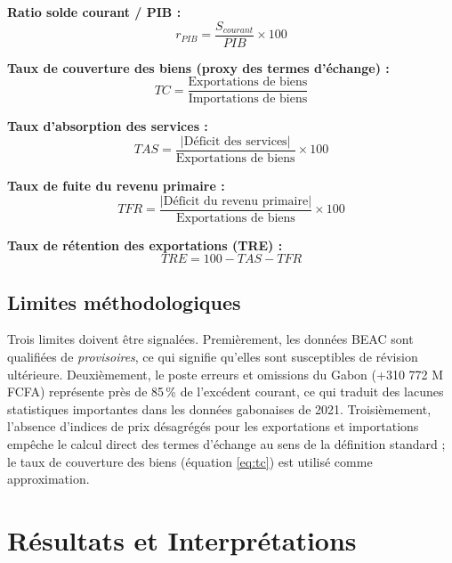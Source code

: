 \documentclass[12pt,a4paper]{article}
\begin{document}
\textbf{Ratio solde courant / PIB :}
\begin{equation}
  r_{PIB} = \frac{S_{courant}}{PIB} \times 100
  \label{eq:ratio_pib}
\end{equation}

\textbf{Taux de couverture des biens (proxy des termes d'échange) :}
\begin{equation}
  TC = \frac{\text{Exportations de biens}}{\text{Importations de biens}}
  \label{eq:tc}
\end{equation}

\textbf{Taux d'absorption des services :}
\begin{equation}
  TAS = \frac{|\text{Déficit des services}|}{\text{Exportations de biens}} \times 100
  \label{eq:tas}
\end{equation}

\textbf{Taux de fuite du revenu primaire :}
\begin{equation}
  TFR = \frac{|\text{Déficit du revenu primaire}|}{\text{Exportations de biens}} \times 100
  \label{eq:tfr}
\end{equation}

\textbf{Taux de rétention des exportations (TRE) :}
\begin{equation}
  TRE = 100 - TAS - TFR
  \label{eq:tre}
\end{equation}

\subsection{Limites méthodologiques}

Trois limites doivent être signalées. Premièrement, les données BEAC sont qualifiées de
\textit{provisoires}, ce qui signifie qu'elles sont susceptibles de révision ultérieure.
Deuxièmement, le poste erreurs et omissions du Gabon (+310 772 M FCFA) représente près de
85\,\% de l'excédent courant, ce qui traduit des lacunes statistiques importantes dans les
données gabonaises de 2021. Troisièmement, l'absence d'indices de prix désagrégés pour les
exportations et importations empêche le calcul direct des termes d'échange au sens de la
définition standard ; le taux de couverture des biens (équation \ref{eq:tc}) est utilisé
comme approximation.

\section{Résultats et Interprétations}
\end{document}
